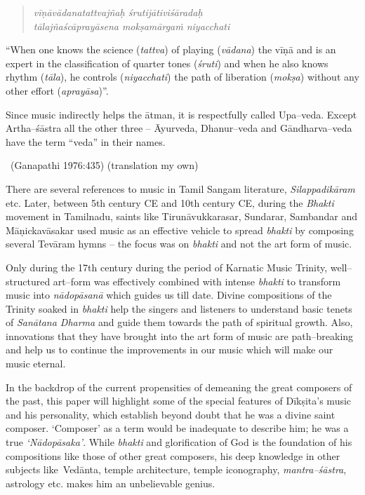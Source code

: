 \begin{verse}
\textit{vīṇāvādanatattvajñaḥ śrutijātiviśāradaḥ} \\\textit{tālajñaścāprayāsena mokṣamārgaṁ niyacchati} 
\end{verse}

“When one knows the science (\textit{tattva}) of playing (\textit{vādana}) the vīṇā and is an expert in the classification of quarter tones (\textit{śruti}) and when he also knows rhythm (\textit{tāla}), he controls (\textit{niyacchati}) the path of liberation (\textit{mokṣa}) without any other effort (\textit{aprayāsa})”.

\begin{myquote}
Since music indirectly helps the ātman, it is respectfully called Upa–veda. Except Artha–śāstra all the other three – Āyurveda, Dhanur–veda and Gāndharva–veda have the term “veda” in their names. 

~\hfill (Ganapathi 1976:435) (translation my own)
\end{myquote}

There are several references to music in Tamil Sangam literature, \textit{Silappadikāram} etc. Later, between 5th century CE and 10th century CE, during the \textit{Bhakti} movement in Tamilnadu, saints like Tirunāvukkarasar, Sundarar, Sambandar and Māṇickavāsakar used music as an effective vehicle to spread \textit{bhakti} by composing several Tevāram hymns – the focus was on \textit{bhakti} and not the art form of music.

Only during the 17th century during the period of Karnatic Music Trinity, well–structured art–form was effectively combined with intense \textit{bhakti} to transform music into \textit{nādopāsanā} which guides us till date. Divine compositions of the Trinity soaked in \textit{bhakti} help the singers and listeners to understand basic tenets of \textit{Sanātana Dharma} and guide them towards the path of spiritual growth. Also, innovations that they have brought into the art form of music are path–breaking and help us to continue the improvements in our music which will make our music eternal.

In the backdrop of the current propensities of demeaning the great composers of the past, this paper will highlight some of the special features of Dīkṣita’s music and his personality, which establish beyond doubt that he was a divine saint composer. ‘Composer’ as a term would be inadequate to describe him; he was a true \textit{‘Nādopāsaka’}. While \textit{bhakti} and glorification of God is the foundation of his compositions like those of other great composers, his deep knowledge in other subjects like Vedānta, temple architecture, temple iconography, \textit{mantra–śāstra}, astrology etc. makes him an unbelievable genius.


